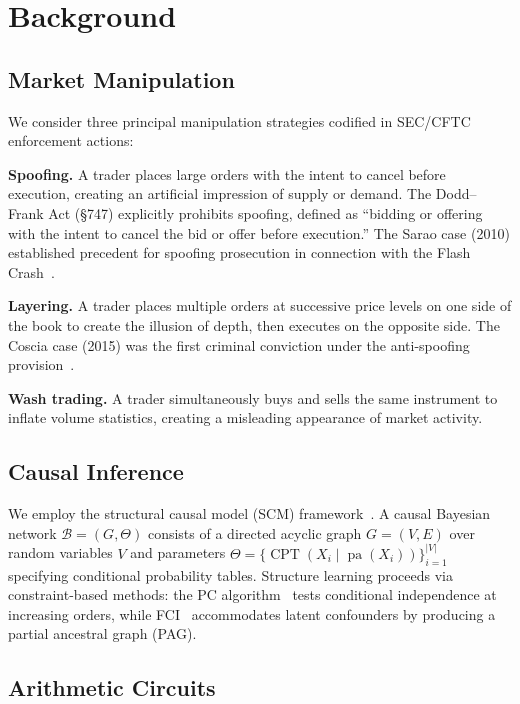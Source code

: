 \documentclass[11pt]{article}
\DeclareMathOperator{\pa}{pa}
\DeclareMathOperator{\CPT}{CPT}
\begin{document}
\section{Background}
\label{sec:background}

\subsection{Market Manipulation}

We consider three principal manipulation strategies codified in SEC/CFTC enforcement actions:

\textbf{Spoofing.} A trader places large orders with the intent to cancel before execution, creating an artificial impression of supply or demand.
The Dodd--Frank Act (\S747) explicitly prohibits spoofing, defined as ``bidding or offering with the intent to cancel the bid or offer before execution.''
The Sarao case (2010) established precedent for spoofing prosecution in connection with the Flash Crash~\cite{cont2010}.

\textbf{Layering.} A trader places multiple orders at successive price levels on one side of the book to create the illusion of depth, then executes on the opposite side.
The Coscia case (2015) was the first criminal conviction under the anti-spoofing provision~\cite{cont2014}.

\textbf{Wash trading.} A trader simultaneously buys and sells the same instrument to inflate volume statistics, creating a misleading appearance of market activity.

\subsection{Causal Inference}

We employ the structural causal model (SCM) framework~\cite{pearl2009}.
A causal Bayesian network $\mathcal{B} = (G, \Theta)$ consists of a directed acyclic graph $G = (V, E)$ over random variables $V$ and parameters $\Theta = \{\CPT(X_i \mid \pa(X_i))\}_{i=1}^{|V|}$ specifying conditional probability tables.
Structure learning proceeds via constraint-based methods:
the PC algorithm~\cite{spirtes2000} tests conditional independence at increasing orders,
while FCI~\cite{spirtes2000} accommodates latent confounders by producing a partial ancestral graph (PAG).

\subsection{Arithmetic Circuits}
\end{document}
